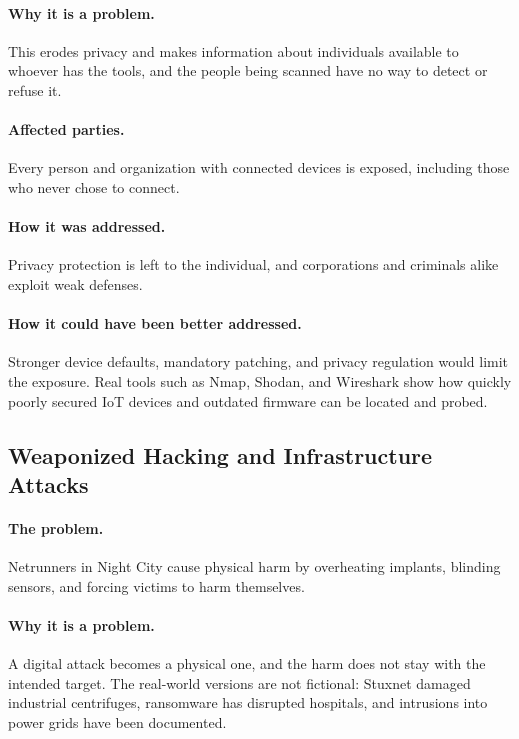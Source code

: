 \documentclass{article}%
\begin{document}
\paragraph{Why it is a problem.}
This erodes privacy and makes information about individuals available to whoever has the tools, and the people being scanned have no way to detect or refuse it.

\paragraph{Affected parties.}
Every person and organization with connected devices is exposed, including those who never chose to connect.

\paragraph{How it was addressed.}
Privacy protection is left to the individual, and corporations and criminals alike exploit weak defenses.

\paragraph{How it could have been better addressed.}
Stronger device defaults, mandatory patching, and privacy regulation would limit the exposure. Real tools such as Nmap, Shodan, and Wireshark show how quickly poorly secured IoT devices and outdated firmware can be located and probed.

\subsection{Weaponized Hacking and Infrastructure Attacks}

\paragraph{The problem.}
Netrunners in Night City cause physical harm by overheating implants, blinding sensors, and forcing victims to harm themselves.

\paragraph{Why it is a problem.}
A digital attack becomes a physical one, and the harm does not stay with the intended target. The real-world versions are not fictional: Stuxnet damaged industrial centrifuges, ransomware has disrupted hospitals, and intrusions into power grids have been documented.
\end{document}
